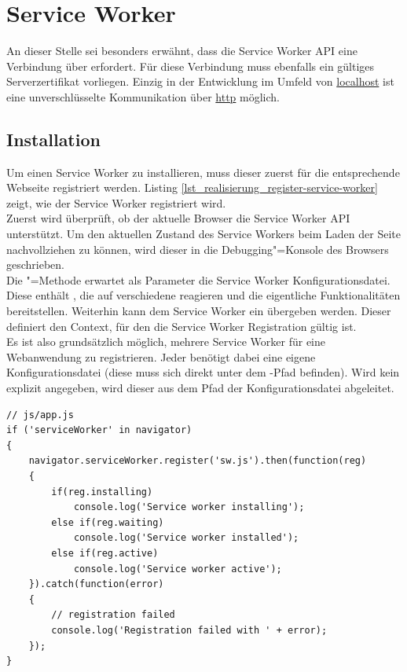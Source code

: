 \section{Service Worker}
\label{sec_realisierung_serviceworker}

An dieser Stelle sei besonders erwähnt, dass die Service Worker API eine Verbindung über  erfordert. Für diese Verbindung muss ebenfalls ein gültiges Serverzertifikat vorliegen. Einzig in der Entwicklung im Umfeld von \url{localhost} ist eine unverschlüsselte Kommunikation über \url{http} möglich.

\subsection{Installation}

Um einen Service Worker zu installieren, muss dieser zuerst für die entsprechende Webseite registriert werden. Listing \ref{lst_realisierung_register-service-worker} zeigt, wie der Service Worker registriert wird.\\
Zuerst wird überprüft, ob der aktuelle Browser die Service Worker API unterstützt. Um den aktuellen Zustand des Service Workers beim Laden der Seite nachvollziehen zu können, wird dieser in die Debugging"=Konsole des Browsers geschrieben.\\
Die "=Methode erwartet als Parameter die Service Worker Konfigurationsdatei. Diese enthält , die auf verschiedene  reagieren und die eigentliche Funktionalitäten bereitstellen. Weiterhin kann dem Service Worker ein  übergeben werden. Dieser definiert den Context, für den die Service Worker Registration gültig ist. \\
Es ist also grundsätzlich möglich, mehrere Service Worker für eine Webanwendung zu registrieren. Jeder  benötigt dabei eine eigene Konfigurationsdatei (diese muss sich direkt unter dem -Pfad befinden). Wird kein  explizit angegeben, wird dieser aus dem Pfad der Konfigurationsdatei abgeleitet. \\

\begin{lstlisting}[caption={Einrichtung Service Worker},label={lst_realisierung_register-service-worker}, frame=single]
// js/app.js
if ('serviceWorker' in navigator)
{
    navigator.serviceWorker.register('sw.js').then(function(reg) 
    {
        if(reg.installing)
            console.log('Service worker installing');
        else if(reg.waiting)
            console.log('Service worker installed');
        else if(reg.active)
            console.log('Service worker active');
    }).catch(function(error)
    {
        // registration failed
        console.log('Registration failed with ' + error);
    });
}
\end{lstlisting}

